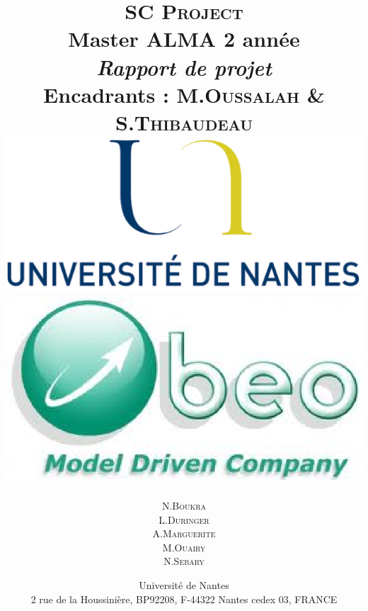 \documentclass{report}
\title{ {\huge \textsc{SC Project}} \\Master ALMA 2\up{eme} année \\\vspace{1cm} \emph{Rapport de projet} \\ {\small Encadrants : M.\textsc{Oussalah} \& S.\textsc{Thibaudeau}} \\\vspace{2cm}\includegraphics[scale=0.17]{img/logouniv} \hspace{1cm}\includegraphics[scale=0.35]{img/logoobeo}\vspace{1.5cm}}
\author{N.\textsc{Boukra} \\ L.\textsc{Duringer} \\  A.\textsc{Marguerite}\\ M.\textsc{Ouairy}\\ N.\textsc{Sebary} \\  \vspace{1cm}}
\date{Université de Nantes \\ 2 rue de la Houssinière, BP92208, F-44322 Nantes cedex 03, FRANCE}
\newcommand{\inputnp}[1]{\newpage}
\begin{document}
\maketitle
\renewcommand{\labelitemi}{$\bullet$} 

\clearpage

\tableofcontents
\clearpage

%
\inputnp{1_Introduction}
\inputnp{2_Objectifs}
\inputnp{3_Methodologie} 
\inputnp{4_Travaux}
\inputnp{5_Bilan}


\listoffigures
%
%
\end{document}

